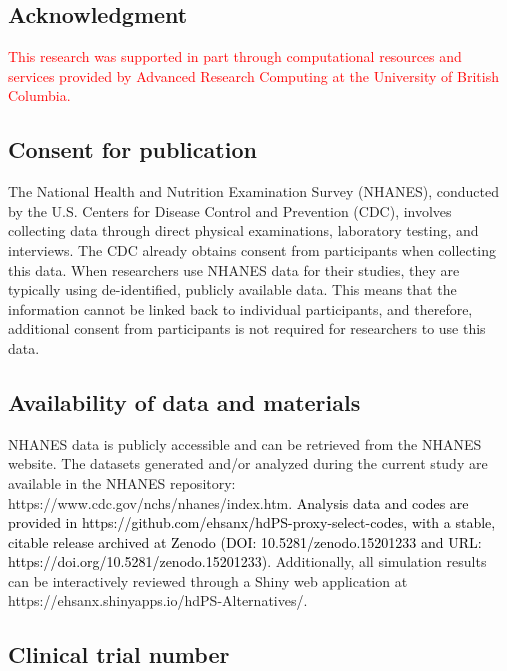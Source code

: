 \documentclass[10pt,letterpaper]{article}
\begin{document}
\subsection*{Acknowledgment}\label{acknowledgment}

\textcolor{red}{This research was supported in part through computational resources and services provided by Advanced Research Computing at the University of British Columbia.}


\subsection*{Consent for publication}\label{consent-for-publication}

The National Health and Nutrition Examination Survey (NHANES), conducted
by the U.S. Centers for Disease Control and Prevention (CDC), involves
collecting data through direct physical examinations, laboratory
testing, and interviews. The CDC already obtains consent from
participants when collecting this data. When researchers use NHANES data
for their studies, they are typically using de-identified, publicly
available data. This means that the information cannot be linked back to
individual participants, and therefore, additional consent from
participants is not required for researchers to use this data.

\subsection*{Availability of data and
materials}\label{availability-of-data-and-materials}

NHANES data is publicly accessible and can be retrieved from the NHANES
website. The datasets generated and/or analyzed during the current study
are available in the NHANES repository:
https://www.cdc.gov/nchs/nhanes/index.htm.
\textcolor{black}{Analysis data and codes are provided in https://github.com/ehsanx/hdPS-proxy-select-codes, with a stable, citable release archived at Zenodo (DOI: 10.5281/zenodo.15201233 and URL: https://doi.org/10.5281/zenodo.15201233)}.
Additionally, all simulation results can be interactively reviewed
through a Shiny web application at
https://ehsanx.shinyapps.io/hdPS-Alternatives/.

\subsection*{Clinical trial number}\label{clinical-trial-number}
\end{document}
